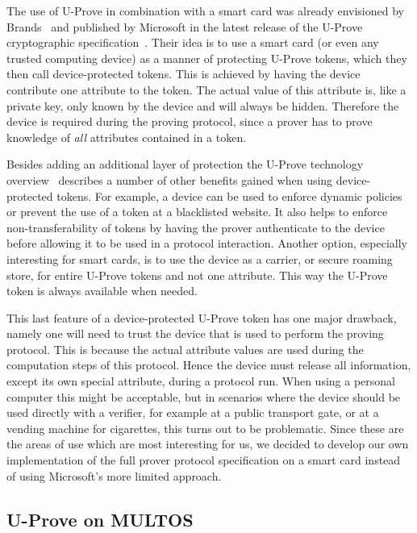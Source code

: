 The use of U-Prove in combination with a smart card was already envisioned
by Brands~\cite{Brands2000} and published by Microsoft in the latest
release of the U-Prove cryptographic
specification~\cite{U-Prove_Crypto2011}. Their idea is to use a smart card
(or even any trusted computing device) as a manner of protecting U-Prove
tokens, which they then call device-protected tokens. This is achieved by
having the device contribute one attribute to the token. The actual value
of this attribute is, like a private key, only known by the device and will
always be hidden. Therefore the device is required during the proving
protocol, since a prover has to prove knowledge of \emph{all} attributes
contained in a token.

Besides adding an additional layer of protection the U-Prove technology
overview~\cite{U-Prove_Overview2011} describes a number of other benefits
gained when using device-protected tokens. For example, a device can be
used to enforce dynamic policies or prevent the use of a token at a
blacklisted website. It also helps to enforce non-transferability of tokens
by having the prover authenticate to the device before allowing it to be
used in a protocol interaction. Another option, especially interesting for
smart cards, is to use the device as a carrier, or secure roaming store,
for entire U-Prove tokens and not one attribute. This way the U-Prove token
is always available when needed.

This last feature of a device-protected U-Prove token has one major
drawback, namely one will need to trust the device that is used to perform
the proving protocol. This is because the actual attribute values are used
during the computation steps of this protocol. Hence the device must
release all information, except its own special attribute, during a
protocol run. When using a personal computer this might be acceptable, but
in scenarios where the device should be used directly with a verifier, for
example at a public transport gate, or at a vending machine for cigarettes,
this turns out to be problematic. Since these are the areas of use which
are most interesting for us, we decided to develop our own implementation
of the full prover protocol specification on a smart card instead of using
Microsoft's more limited approach.

\subsection{U-Prove on MULTOS}

